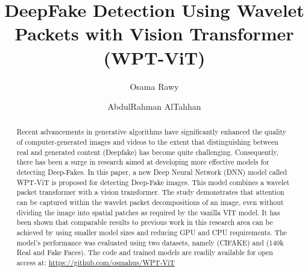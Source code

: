 \documentclass{svproc}
\begin{document}
\mainmatter		 %
%
\title{DeepFake Detection Using Wavelet Packets with Vision Transformer
  (WPT-ViT)}
%
%
\author{Osama Rawy \and AbdulRahman AlTahhan}
%
%
%

\maketitle		%

\begin{abstract}
  Recent advancements in generative algorithms have significantly enhanced the quality of computer-generated images and videos to the extent that distinguishing between real and generated content (Deepfake) has become quite challenging. Consequently, there has been a surge in research aimed at developing more effective models for detecting Deep-Fakes. In this paper, a new Deep Neural Network (DNN) model called WPT-ViT is proposed for detecting Deep-Fake images. This model combines a wavelet packet transformer with a vision transformer. The study demonstrates that attention can be captured within the wavelet packet decompositions of an image, even without dividing the image into spatial patches as required by the vanilla VIT model. It has been shown that comparable results to previous work in this research area can be achieved by using smaller model sizes and reducing GPU and CPU requirements. The model's performance was evaluated using two datasets, namely (CIFAKE) and (140k Real and Fake Faces). The code and trained models are readily available for open access at: \url{https://github.com/osmahus/WPT-ViT} 

 

\end{abstract}
%
\end{document}
